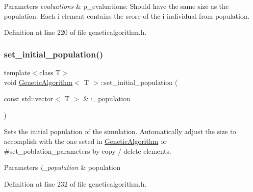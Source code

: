 \begin{DoxyParams}{Parameters}
{\em evaluations} & p\+\_\+evaluations\+: Should have the same size as the population. Each i element contains the score of the i individual from population. \\
\hline
\end{DoxyParams}


Definition at line 220 of file geneticalgorithm.\+h.

\mbox{\label{class_genetic_algorithm_a5ed6d3f823943638e0c3688fdf788e1c}} 
\subsubsection{\texorpdfstring{set\+\_\+initial\+\_\+population()}{set\_initial\_population()}}
{\footnotesize\ttfamily template$<$class T$>$ \\
void \mbox{\hyperlink{class_genetic_algorithm}{Genetic\+Algorithm}}$<$ T $>$\+::set\+\_\+initial\+\_\+population (\begin{DoxyParamCaption}\item[{const std\+::vector$<$ T $>$ \&}]{i\+\_\+population }\end{DoxyParamCaption})\hspace{0.3cm}{\ttfamily [inline]}}



Sets the initial population of the simulation. Automatically adjust the size to accomplish with the one seted in \mbox{\hyperlink{class_genetic_algorithm}{Genetic\+Algorithm}} or \#set\+\_\+poblation\+\_\+parameters by copy / delete elements. 


\begin{DoxyParams}{Parameters}
{\em i\+\_\+population} & population \\
\hline
\end{DoxyParams}


Definition at line 232 of file geneticalgorithm.\+h.

\mbox{\label{class_genetic_algorithm_a9e3afa46dbfb501b42e1905023b47432}} 
